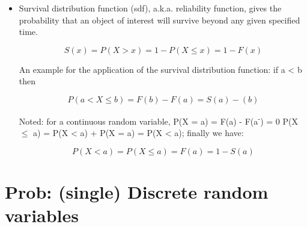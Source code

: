 \documentclass[12pt]{report}
\renewcommand{\_}{\kern-1.5pt\textunderscore\kern-1.5pt}
\begin{document}
\begin{itemize}
\begin{itemize}
	\item P(a < X < b) = F(b\textsuperscript{-}) - F(a)
\end{itemize}\par

\begin{adjustwidth}{0.5in}{0.0in}
Type of graphs:\par

\end{adjustwidth}

\begin{itemize}
	\item For a continuous distribution, the graph of cdf is continuous non-decreasing curve. \par

	\item For a discrete distribution, the graph of its cdf consists of a series of horizontal lines with jumps between them. \par

	\item A cdf of a mixed distribution contains both jumps and pieces of continuous increasing curves.
\end{itemize}\par

	\item Survival distribution function (sdf), a.k.a. reliability function, gives the probability that an object of interest will survive beyond any given specified time. \par

 \[ S \left( x \right) =P \left( X>x \right) =1-P \left( X \leq x \right) =1-F \left( x \right)  \] \par

An example for the application of the survival distribution function: if a < b then\par

 \[ P \left( a<X \leq b \right) =F \left( b \right) -F \left( a \right) =S \left( a \right) - \left( b \right)  \] \par

Noted: for a continuous random variable, P(X = a) = F(a) - F(a\textsuperscript{-}) = 0  P(X $ \leq $  a) = P(X < a) + P(X = a) = P(X < a); finally we have: \par

 \[ P \left( X<a \right) =P \left( X \leq a \right) =F \left( a \right) =1-S \left( a \right)  \] \par


\end{itemize}\section*{Prob: (single) Discrete random variables}
\end{document}

